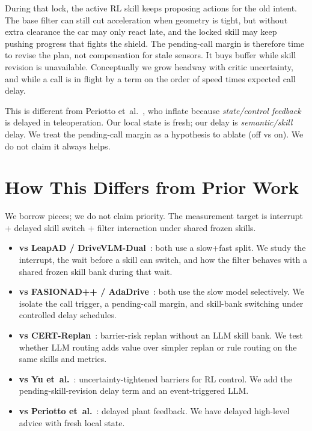 \documentclass[11pt]{article}
\begin{document}
During that lock, the active RL skill keeps proposing actions for the old intent. The base filter can still cut acceleration when geometry is tight, but without extra clearance the car may only react late, and the locked skill may keep pushing progress that fights the shield. The pending-call margin is therefore time to revise the plan, not compensation for stale sensors. It buys buffer while skill revision is unavailable. Conceptually we grow headway with critic uncertainty, and while a call is in flight by a term on the order of speed times expected call delay.

This is different from Periotto et~al.~\citep{periotto2024mpccbf}, who inflate because \emph{state/control feedback} is delayed in teleoperation. Our local state is fresh; our delay is \emph{semantic/skill} delay. We treat the pending-call margin as a hypothesis to ablate (off vs on). We do not claim it always helps.

\section{How This Differs from Prior Work}
We borrow pieces; we do not claim priority. The measurement target is interrupt + delayed skill switch + filter interaction under shared frozen skills.

\begin{itemize}
  \item \textbf{vs LeapAD / DriveVLM-Dual}~\citep{mei2024leapad,tian2024drivevlm}: both use a slow+fast split. We study the interrupt, the wait before a skill can switch, and how the filter behaves with a shared frozen skill bank during that wait.
  \item \textbf{vs FASIONAD++ / AdaDrive}~\citep{qian2025fasionadpp,zhang2025adadrive}: both use the slow model selectively. We isolate the call trigger, a pending-call margin, and skill-bank switching under controlled delay schedules.
  \item \textbf{vs CERT-Replan}~\citep{suganda2026certreplan}: barrier-risk replan without an LLM skill bank. We test whether LLM routing adds value over simpler replan or rule routing on the same skills and metrics.
  \item \textbf{vs Yu et~al.}~\citep{yu2025usdc}: uncertainty-tightened barriers for RL control. We add the pending-skill-revision delay term and an event-triggered LLM.
  \item \textbf{vs Periotto et~al.}~\citep{periotto2024mpccbf}: delayed plant feedback. We have delayed high-level advice with fresh local state.
\end{itemize}
\end{document}
